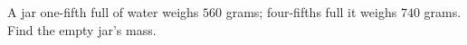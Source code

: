 A jar one-fifth full of water weighs $560$ grams; four-fifths full it weighs $740$ grams. Find the empty jar's mass.
